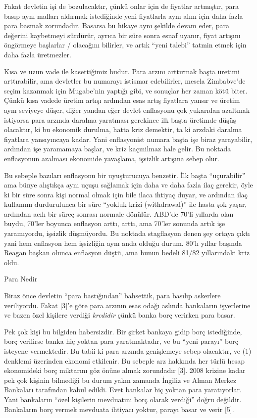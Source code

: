 \documentclass[12pt,fleqn]{article}\usepackage{../../common}
\begin{document}
Fakat devletin işi de bozulacaktır, çünkü onlar için de fiyatlar artmıştır,
para basıp aynı malları aldırmak istediğinde yeni fiyatlarla aynı alım için
daha fazla para basmak zorundadır. Basarsa bu hikaye aynı şekilde devam
eder, para değerini kaybetmeyi sürdürür, ayrıca bir süre sonra esnaf
uyanır, fiyat artışını öngörmeye başlarlar / olacağını bilirler, ve artık
``yeni talebi'' tatmin etmek için daha fazla üretmezler.

Kısa ve uzun vade ile kasettiğimiz budur. Para arzını arttırmak başta
üretimi arttırabilir, ama devletler bu numarayı istismar edebilirler,
mesela Zimbabve'de seçim kazanmak için Mugabe'nin yaptığı gibi, ve sonuçlar
her zaman kötü biter. Çünkü kısa vadede üretim artışı ardından esas artış
fiyatlara yansır ve üretim aynı seviyeye düşer, diğer yandan eğer devlet
enflasyonu çok yukarıdan azaltmak istiyorsa para arzında daralma yaratması
gerekince ilk başta üretimde düşüş olacaktır, ki bu ekonomik durulma, hatta
kriz demektir, ta ki arzdaki daralma fiyatlara yansıyıncaya kadar. Yani
enflasyonist numara başta işe biraz yarayabilir, ardından işe yaramamaya
başlar, ve kriz kaçınilmaz hale gelir. Bu noktada enflasyonun azalması
ekonomide yavaşlama, işsizlik artışına sebep olur. 

Bu sebeple bazıları enflasyonu bir uyuşturucuya benzetir. İlk başta
``uçurabilir'' ama bünye alıştıkça aynı uçuşu sağlamak için daha ve daha
fazla ilaç gerekir, öyle ki bir süre sonra kişi normal olmak için bile
ilaca ihtiyaç duyar, ve ardından ilaç kullanımı durdurulunca bir süre
``yokluk krizi (withdrawal)'' ile hasta şok yaşar, ardından acılı bir süreç
sonrası normale dönülür. ABD'de 70'li yıllarda olan buydu, 70'ler boyunca
enflasyon arttı, arttı, ama 70'ler sonunda artık işe yaramıyordu, işsizlik
düşmüyordu. Bu noktada stagflasyon denen şey ortaya çıktı yani hem
enflasyon hem işsizliğin aynı anda olduğu durum. 80'lı yıllar başında
Reagan başkan olunca enflasyon düştü, ama bunun bedeli 81/82 yıllarındaki
kriz oldu.

Para Nedir 

Biraz önce devletin ``para bastığından'' bahsettik, para basılıp askerlere
veriliyordu. Fakat [3]'e göre para arzının esas odağı aslında bankaların
işyerlerine ve bazen özel kişilere verdiği {\em kredidir} çünkü banka borç
verirken para basar. 

Pek çok kişi bu bilgiden habersizdir. Bir şirket bankaya gidip borç
istediğinde, borç verilirse banka hiç yoktan para yaratmaktadır, ve bu
``yeni parayı'' borç isteyene vermektedir. Bu tabii ki para arzında
genişlemeye sebep olacaktır, ve (1) denklemi üzerinden ekonomi
etkilenir. Bu sebeple arz hakkında her türlü hesap ekonomideki borç
miktarını göz önüne almak zorundadır [3]. 2008 krizine kadar pek çok
kişinin bilmediği bu durum yakın zamanda İngiliz ve Alman Merkez Bankaları
tarafından kabul edildi. Evet bankalar hiç yoktan para yaratıyorlar. Yani
bankaların ``özel kişilerin mevduatını borç olarak verdiği'' doğru
değildir. Bankaların borç vermek mevduata ihtiyacı yoktur, parayı basar ve
verir [5].
\end{document}
